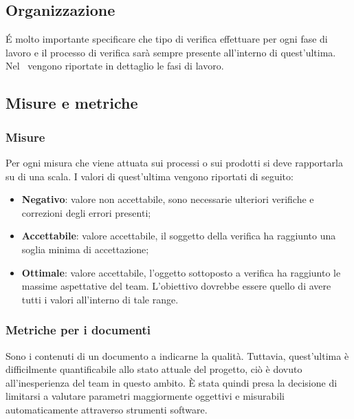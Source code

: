 \documentclass[../PianoDiQualifica.tex]{subfiles}
\begin{document}
		\subsection{Organizzazione}
		É molto importante specificare che tipo di verifica effettuare per ogni fase di lavoro e il processo di verifica sarà sempre presente all'interno di quest'ultima. Nel \pianodiprogettov\ vengono riportate in dettaglio le fasi di lavoro.

		\subsection{Misure e metriche}
			\subsubsection{Misure}
			Per ogni misura che viene attuata sui processi o sui prodotti si deve rapportarla su di una scala. I valori di quest'ultima vengono riportati di seguito:
			\begin{itemize}
				\item \textbf{Negativo}: valore non accettabile, sono necessarie ulteriori verifiche e correzioni degli errori presenti;
				\item \textbf{Accettabile}: valore accettabile, il soggetto della verifica ha raggiunto una soglia minima di accettazione;
				\item \textbf{Ottimale}: valore accettabile, l'oggetto sottoposto a verifica ha raggiunto le massime aspettative del team. L'obiettivo dovrebbe essere quello di avere tutti i valori all'interno di tale range.
			\end{itemize}

			\subsubsection{Metriche per i documenti}
			Sono i contenuti di un documento a indicarne la qualità. Tuttavia, quest'ultima è difficilmente quantificabile allo stato attuale del progetto, ciò è dovuto all'inesperienza del team in questo ambito. È stata quindi presa la decisione di limitarsi a valutare parametri maggiormente oggettivi e misurabili automaticamente attraverso strumenti software.
\end{document}

